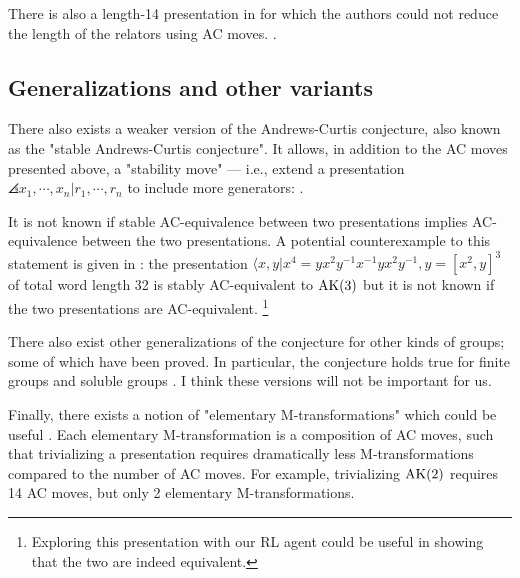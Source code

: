 There is also a length-14 presentation in \cite{MMS} for which the authors could not reduce the length of the relators using AC moves.
\bea
{}.
\eea

\subsection{Generalizations and other variants}

There also exists a weaker version of the Andrews-Curtis conjecture, also known as the "stable Andrews-Curtis conjecture".
It allows, in addition to the AC moves presented above, a "stability move" --- i.e., extend a presentation $\angles{x_1, \cdots, x_n | r_1, \cdots, r_n}$ to include more generators:
\bea
{}.
\eea

It is not known if stable AC-equivalence between two presentations implies AC-equivalence between the two presentations.
A potential counterexample to this statement is given in \cite{MMS}: the presentation $\langle x, y | x^4 = y x^2 y^{-1} x^{-1} y x^2 y^{-1}, y = [x^2, y]^3 $ of total word length 32 is stably AC-equivalent to $\text{AK}(3)$ but it is not known if the two presentations are AC-equivalent.
\footnote{Exploring this presentation with our RL agent could be useful in showing that the two are indeed equivalent.}
\newline

There also exist other generalizations of the conjecture for other kinds of groups; some of which have been proved.
In particular, the conjecture holds true for finite groups and soluble groups \cite{Borovik, Guyot}.
I think these versions will not be important for us.
\newline

Finally, there exists a notion of "elementary M-transformations" which could be useful \cite{BurnsI, BurnsII}.
Each elementary M-transformation is a composition of AC moves, such that trivializing a presentation requires dramatically less M-transformations compared to the number of AC moves.
For example, trivializing $\text{AK}(2)$ requires 14 AC moves, but only 2 elementary M-transformations.